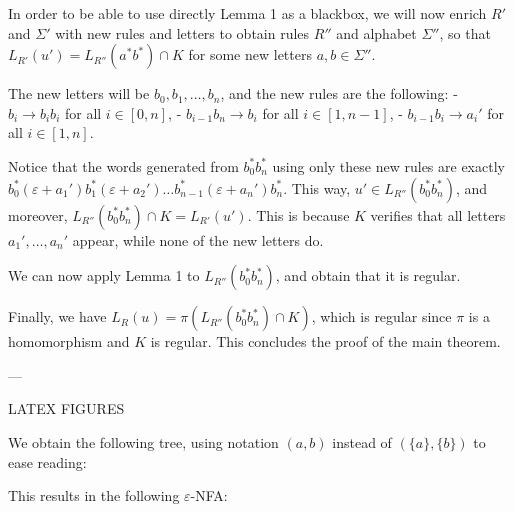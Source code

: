 \documentclass[12pt]{article}
\begin{document}
In order to be able to use directly Lemma 1 as a blackbox, we will now enrich $R'$ and $\Sigma'$ with new rules and letters to obtain rules $R''$ and alphabet $\Sigma''$, so that $L_{R'}(u')=L_{R''}(a^*b^*)\cap K$ for some new letters $a,b\in\Sigma''$.

The new letters will be $b_0,b_1,\dots,b_n$, and the new rules are the following:
- $b_i\to b_ib_i$ for all $i\in[0,n]$,
- $b_{i-1} b_n\to b_{i}$ for all $i\in[1,n-1]$,
- $b_{i-1}b_{i}\to a_i'$ for all $i\in[1,n]$.

Notice that the words generated from $b_0^*b_n^*$ using only these new rules are exactly $b_0^*(\varepsilon+a_1')b_1^*(\varepsilon+a_2')\dots b_{n-1}^*(\varepsilon+a_n')b_n^*$.
This way, $u'\in L_{R''}(b_0^*b_n^*)$, and moreover, $L_{R''}(b_0^*b_n^*)\cap K=L_{R'}(u')$. This is because $K$ verifies that all letters $a_1',\dots,a_n'$ appear, while none of the new letters do.

We can now apply Lemma 1 to $L_{R''}(b_0^*b_n^*)$, and obtain that it is regular. 

Finally, we have $L_R(u)=\pi(L_{R''}(b_0^*b_n^*)\cap K)$, which is regular since $\pi$ is a homomorphism and $K$ is regular. This concludes the proof of the main theorem.

---

\bigskip
LATEX FIGURES

We obtain the following tree, using notation $(a,b)$ instead of $(\{a\},\{b\})$ to ease reading:

\begin{center}
  \end{center}
  

This results in the following $\varepsilon$-NFA:

\end{document}
